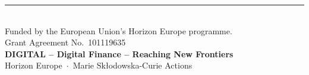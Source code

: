 \documentclass[a4paper,10pt]{article}
\begin{document}
\vfill

\begin{center}
\begin{minipage}{0.85\textwidth}
  \centering
  {\color{confgold}\rule{0.6\textwidth}{0.5pt}}\\[4pt]
  {\footnotesize\color{white!80}
  Funded by the European Union's Horizon Europe programme.\\
  Grant Agreement No.\ 101119635}\\[4pt]
  {\small\color{confgold}\bfseries
  DIGITAL -- Digital Finance -- Reaching New Frontiers}\\[2pt]
  {\footnotesize\color{white!70}
  Horizon Europe \,$\cdot$\, Marie Sk\l{}odowska-Curie Actions}
\end{minipage}
\end{center}
\vspace{0.4cm}

\clearpage
\end{document}

